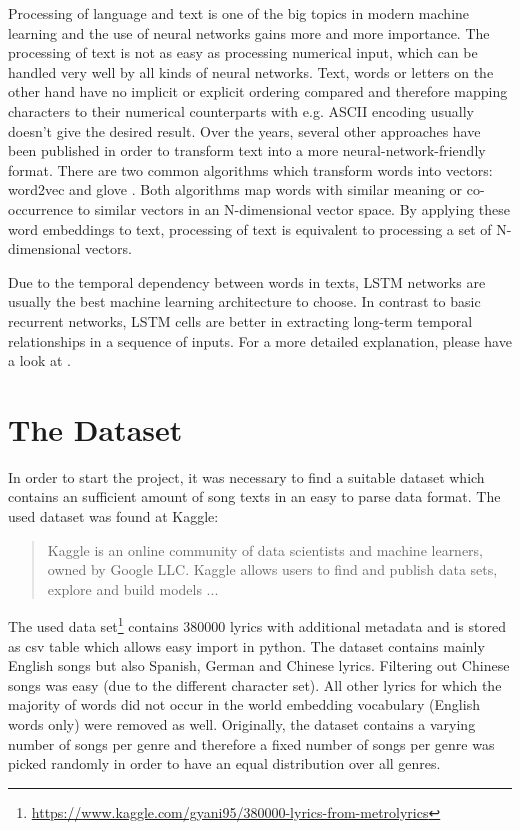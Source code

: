 \documentclass[12pt]{article}
\begin{document}
Processing of language and text is one of the big topics in modern machine learning and the use of neural networks gains more and more importance. The processing of text is not as easy as processing numerical input, which can be handled very well by all kinds of neural networks. Text, words or letters on the other hand have no implicit or explicit ordering compared and therefore mapping characters to their numerical counterparts with e.g. ASCII encoding usually doesn't give the desired result.
Over the years, several other approaches have been published in order to transform text into a more neural-network-friendly format. There are two common algorithms which transform words into vectors: word2vec \cite{goldberg2014word2vec} and glove \cite{pennington2014glove}. Both algorithms map words with similar meaning or co-occurrence to similar vectors in an N-dimensional vector space. By applying these word embeddings to text, processing of text is equivalent to processing a set of N-dimensional vectors.

Due to the temporal dependency between words in texts, LSTM\cite{gers1999learning} networks are usually the best machine learning architecture to choose. In contrast to basic recurrent networks, LSTM cells are better in extracting long-term temporal relationships in a sequence of inputs. For a more detailed explanation, please have a look at \cite{gers1999learning}.

\section{The Dataset}\label{sec:dataset}

In order to start the project, it was necessary to find a suitable dataset which contains an sufficient amount of song texts in an easy to parse data format. The used dataset was found at Kaggle: \blockcquote{kaggleWikipedia}{Kaggle is an online community of data scientists and machine learners, owned by Google LLC. Kaggle allows users to find and publish data sets, explore and build models ... 
}. The used data set\footnote{\url{https://www.kaggle.com/gyani95/380000-lyrics-from-metrolyrics}} contains 380000 lyrics with additional metadata and is stored as csv table which allows easy import in python. The dataset contains mainly English songs but also Spanish, German and Chinese lyrics. Filtering out Chinese songs was easy (due to the different character set). All other lyrics for which the majority of words did not occur in the world embedding vocabulary (English words only) were removed as well. Originally, the dataset contains a varying number of songs per genre and therefore a fixed number of songs per genre was picked randomly in order to have an equal distribution over all genres.
\end{document}
